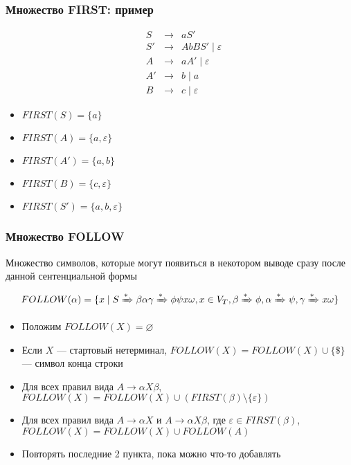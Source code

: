 \documentclass{beamer}
\newcommand{\derive}[0]{\xRightarrow[]{*}}
\begin{document}
\begin{frame}[fragile]
  \transwipe[direction=90]
  \frametitle{Множество FIRST: пример}
  \[
  \begin{array}{crcl}
  &S  & \to & a S' \\

  &S' & \to & A b B S' \mid \varepsilon \\

  &A  & \to & a A' \mid \varepsilon \\
  &A' & \to & b \mid a \\
  &B  & \to & c \mid \varepsilon
  \end{array}
  \] \pause

  \begin{itemize}
    \item $FIRST(S) = \{ a \}$ \pause
    \item $FIRST(A) = \{ a, \varepsilon \}$ \pause
    \item $FIRST(A') = \{ a, b \}$ \pause
    \item $FIRST(B) = \{ c, \varepsilon \}$ \pause
    \item $FIRST(S') = \{ a, b, \varepsilon \}$
  \end{itemize}
\end{frame}

\begin{frame}[fragile]
  \transwipe[direction=90]
  \frametitle{Множество FOLLOW}
\begin{center}
  Множество символов, которые могут появиться в некотором выводе сразу после данной сентенциальной формы
\end{center}


$$
FOLLOW(\alpha) = \{ x \mid S \derive \beta \alpha \gamma \derive \phi \psi x \omega, x \in V_T, \beta \derive \phi, \alpha \derive \psi, \gamma \derive x \omega\}
$$

  \begin{itemize}

   \item Положим $FOLLOW(X) = \varnothing $
   \item Если $X$ --- стартовый нетерминал, $FOLLOW(X) = FOLLOW(X) \cup \{ \$ \}$ --- символ конца строки
   \item Для всех правил вида $A \to \alpha X \beta$, $FOLLOW(X) = FOLLOW(X) \cup (FIRST(\beta) \setminus \{ \varepsilon\})$
   \item Для всех правил вида $A \to \alpha X$ и $A \to \alpha X \beta$, где $\varepsilon \in FIRST(\beta)$, $FOLLOW(X) = FOLLOW(X) \cup FOLLOW(A)$
   \item Повторять последние 2 пункта, пока можно что-то добавлять
  \end{itemize}
\end{frame}
\end{document}
